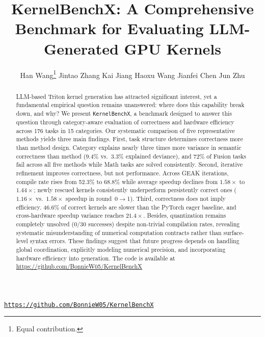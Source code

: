 \documentclass[twoside,11pt,dvipsnames]{article}
\title{
    KernelBenchX: A Comprehensive Benchmark for Evaluating LLM-Generated GPU Kernels
}
\author{\small
Han Wang\thanks{Equal contribution.} \quad
Jintao Zhang\footnotemark[1] \quad
Kai Jiang \quad
Haoxu Wang \quad
Jianfei Chen \quad
Jun Zhu
}
\newcommand{\oursys}{\texttt{KernelBenchX}\xspace}
\begin{document}
\maketitle
\begin{center}
\texttt{\href{https://github.com/BonnieW05/KernelBenchX}{https://github.com/BonnieW05/KernelBenchX}}
\end{center}

\begin{abstract}
LLM-based Triton kernel generation has attracted significant interest, yet a fundamental empirical question remains unanswered: where does this capability break down, and why? We present \oursys, a benchmark designed to answer this question through category-aware evaluation of correctness and hardware efficiency across 176 tasks in 15 categories. 
Our systematic comparison of five representative methods yields three main findings. 
First, task structure determines correctness more than method design. Category explains nearly three times more variance in semantic correctness than method (9.4\% vs.\ 3.3\% explained deviance), and 72\% of Fusion tasks fail across all five methods while Math tasks are solved consistently. 
Second, iterative refinement improves correctness, but not performance. Across GEAK iterations, compile rate rises from 52.3\% to 68.8\% while average speedup declines from $1.58\times$ to $1.44\times$; newly rescued kernels consistently underperform persistently correct ones ($1.16\times$ vs.\ $1.58\times$ speedup in round~0$\to$1). 
Third, correctness does not imply efficiency. 46.6\% of correct kernels are slower than the PyTorch eager baseline, and cross-hardware speedup variance reaches $21.4\times$. 
Besides, quantization remains completely unsolved (0/30 successes) despite non-trivial compilation rates, revealing systematic misunderstanding of numerical computation contracts rather than surface-level syntax errors. 
These findings suggest that future progress depends on handling global coordination, explicitly modeling numerical precision, and incorporating hardware efficiency into generation. The code is available at \url{https://github.com/BonnieW05/KernelBenchX}
\end{abstract}










\newpage




\newpage

\appendix

\end{document}
